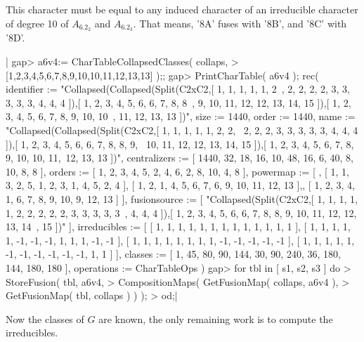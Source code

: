 This character must be equal  to any induced  character of an irreducible
character  of degree 10  of $A_6.2_2$  and $A_6.2_3$.   That  means, '8A'
fuses with '8B', and '8C' with '8D'.

|    gap> a6v4:= CharTableCollapsedClasses( collaps,
    >     [1,2,3,4,5,6,7,8,9,10,10,11,12,13,13] );;
    gap> PrintCharTable( a6v4 );
    rec( identifier := "Collapsed(Collapsed(Split(C2xC2,[ 1, 1, 1, 1, 1, 2\
    , 2, 2, 2, 2, 3, 3, 3, 3, 3, 4, 4, 4 ]),[ 1, 2, 3, 4, 5, 6, 6, 7, 8, 8\
    , 9, 10, 11, 12, 12, 13, 14, 15 ]),[ 1, 2, 3, 4, 5, 6, 7, 8, 9, 10, 10\
    , 11, 12, 13, 13 ])", size := 1440, order :=
    1440, name := "Collapsed(Collapsed(Split(C2xC2,[ 1, 1, 1, 1, 1, 2, 2, \
    2, 2, 2, 3, 3, 3, 3, 3, 4, 4, 4 ]),[ 1, 2, 3, 4, 5, 6, 6, 7, 8, 8, 9, \
    10, 11, 12, 12, 13, 14, 15 ]),[ 1, 2, 3, 4, 5, 6, 7, 8, 9, 10, 10, 11,\
     12, 13, 13 ])", centralizers := [ 1440, 32, 18, 16, 10, 48, 16, 6,
      40, 8, 10, 8, 8 ], orders := [ 1, 2, 3, 4, 5, 2, 4, 6, 2, 8, 10, 4,
      8 ], powermap := [ , [ 1, 1, 3, 2, 5, 1, 2, 3, 1, 4, 5, 2, 4 ],
      [ 1, 2, 1, 4, 5, 6, 7, 6, 9, 10, 11, 12, 13 ],,
      [ 1, 2, 3, 4, 1, 6, 7, 8, 9, 10, 9, 12, 13 ] ], fusionsource :=
    [ "Collapsed(Split(C2xC2,[ 1, 1, 1, 1, 1, 2, 2, 2, 2, 2, 3, 3, 3, 3, 3\
    , 4, 4, 4 ]),[ 1, 2, 3, 4, 5, 6, 6, 7, 8, 8, 9, 10, 11, 12, 12, 13, 14\
    , 15 ])" ], irreducibles :=
    [ [ 1, 1, 1, 1, 1, 1, 1, 1, 1, 1, 1, 1, 1 ],
      [ 1, 1, 1, 1, 1, -1, -1, -1, 1, 1, 1, -1, -1 ],
      [ 1, 1, 1, 1, 1, 1, 1, 1, -1, -1, -1, -1, -1 ],
      [ 1, 1, 1, 1, 1, -1, -1, -1, -1, -1, -1, 1, 1 ] ], classes :=
    [ 1, 45, 80, 90, 144, 30, 90, 240, 36, 180, 144, 180, 180
     ], operations := CharTableOps )
    gap> for tbl in [ s1, s2, s3 ] do
    >      StoreFusion( tbl, a6v4,
    >                   CompositionMaps( GetFusionMap( collaps, a6v4 ),
    >                                    GetFusionMap( tbl, collaps ) ) );
    >    od;|

Now the classes of $G$ are known, the only remaining work is  to  compute
the irreducibles.

